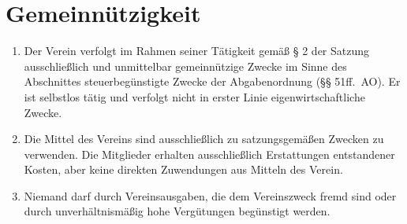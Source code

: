 \documentclass[fontsize=12pt,paper=a4,pagesize,headings=small]{scrartcl}
\begin{document}
\section{Gemeinnützigkeit}
\begin{enumerate}

    \item Der Verein verfolgt im Rahmen seiner Tätigkeit gemäß § 2 der
    Satzung ausschließlich und unmittelbar gemeinnützige Zwecke im
    Sinne des Abschnittes steuerbegünstigte Zwecke der Abgabenordnung
    (§§ 51ff.\ AO). Er ist selbstlos tätig und verfolgt nicht in erster
    Linie eigenwirtschaftliche Zwecke.

    \item Die Mittel des Vereins sind ausschließlich zu satzungsgemäßen
    Zwecken zu verwenden. Die Mitglieder erhalten ausschließlich
    Erstattungen entstandener Kosten, aber keine direkten Zuwendungen
    aus Mitteln des Verein.

    \item Niemand darf durch Vereinsausgaben, die dem Vereinszweck
    fremd sind oder durch unverhältnismäßig hohe Vergütungen begünstigt
    werden.
\end{enumerate}
\end{document}
